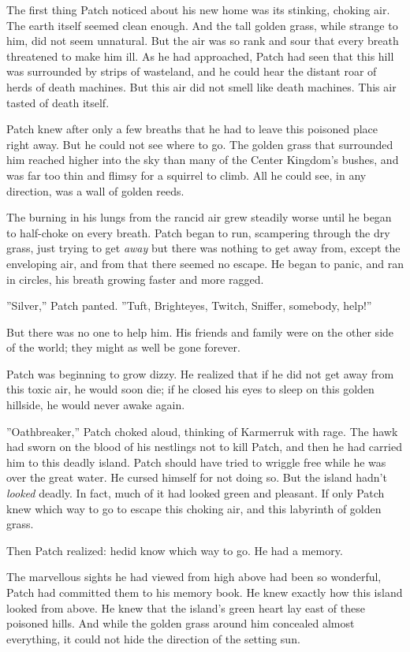 \documentclass[12pt]{book}
\begin{document}
 The first thing Patch noticed about his new home was its stinking, choking air. The earth itself seemed clean enough. And the tall golden grass, while strange to him, did not seem unnatural. But the air was so rank and sour that every breath threatened to make him ill. As he had approached, Patch had seen that this hill was surrounded by strips of wasteland, and he could hear the distant roar of herds of death machines. But this air did not smell like death machines. This air tasted of death itself.\par
 Patch knew after only a few breaths that he had to leave this poisoned place right away. But he could not see where to go. The golden grass that surrounded him reached higher into the sky than many of the Center Kingdom's bushes, and was far too thin and flimsy for a squirrel to climb. All he could see, in any direction, was a wall of golden reeds. \par
 The burning in his lungs from the rancid air grew steadily worse until he began to half-choke on every breath. Patch began to run, scampering through the dry grass, just trying to get {\it away} %
 but there was nothing to get away from, except the enveloping air, and from that there seemed no escape. He began to panic, and ran in circles, his breath growing faster and more ragged. \par
 ''Silver,'' Patch panted. ''Tuft, Brighteyes, Twitch, Sniffer, somebody, help!''\par
 But there was no one to help him. His friends and family were on the other side of the world; they might as well be gone forever.\par
 Patch was beginning to grow dizzy. He realized that if he did not get away from this toxic air, he would soon die; if he closed his eyes to sleep on this golden hillside, he would never awake again.\par
 ''Oathbreaker,'' Patch choked aloud, thinking of Karmerruk with rage. The hawk had sworn on the blood of his nestlings not to kill Patch, and then he had carried him to this deadly island. Patch should have tried to wriggle free while he was over the great water. He cursed himself for not doing so. But the island hadn't {\it looked} deadly. In fact, much of it had looked green and pleasant. If only Patch knew which way to go to escape this choking air, and this labyrinth of golden grass.\par
 Then Patch realized: he{\it  }did know which way to go. He had a memory.\par
The marvellous sights he had viewed from high above had been so wonderful, Patch had committed them to his memory book. He knew exactly how this island looked from above. He knew that the island's green heart lay east of these poisoned hills. And while the golden grass around him concealed almost everything, it could not hide the direction of the setting sun.\par
\end{document}
